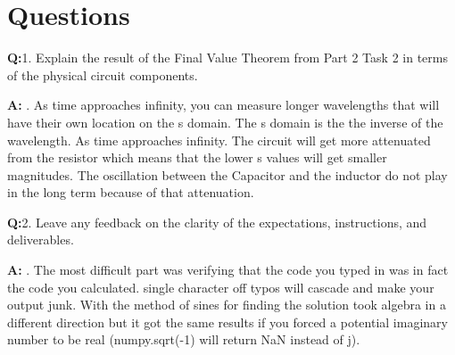 \documentclass[12pt,a4paper]{article}
\newcommand{\Q}{\leavevmode\par\textbf {Q:}}
\newcommand{\A}{\par\textbf{A:} \normalfont}
\begin{document}
\section{Questions}\label{sec:res}


\Q 1. Explain the result of the Final Value Theorem from Part 2 Task 2 in terms of the physical circuit components.
\A 1. As time approaches infinity, you can measure longer wavelengths  that will have their own location on the s domain. The s domain is the the inverse of the wavelength. As time approaches infinity. The circuit will get more attenuated from the resistor which means that the lower s values  will get smaller magnitudes.  The oscillation between the Capacitor and the inductor do not play in the long term because of that attenuation.

\Q 2. Leave any feedback on the clarity of the expectations, instructions, and deliverables.
\A 2. The most difficult part was verifying that the code you typed in was in fact the code you calculated. single character off typos will cascade and make your output junk.  With the method of sines for finding the solution took algebra in a different direction but it got the same results if you forced a potential imaginary number to be real (numpy.sqrt(-1) will return NaN instead of j).





\end{document}
